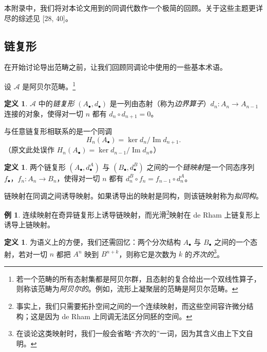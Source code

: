 \documentclass[11pt,a4paper]{article}
\theoremstyle{plain}
\theoremstyle{definition}
\newtheorem{definition}[theorem]{定义}
\newtheorem*{example}{例}
\begin{document}
本附录中，我们将对本论文用到的同调代数作一个极简的回顾。关于这些主题更详尽的综述见 [28, 40]。

\subsection{链复形}

在开始讨论导出范畴之前，让我们回顾同调论中使用的一些基本术语。

设 $\mathcal{A}$ 是阿贝尔范畴。\footnote{若一个范畴的所有态射集都是阿贝尔群，且态射的复合给出一个双线性算子，则称该范畴为\emph{阿贝尔的}。例如，流形上凝聚层的范畴是阿贝尔范畴。}

\begin{definition}
$\mathcal{A}$ 中的\emph{链复形} $(A_\bullet,d_\bullet)$ 是一列由态射（称为\emph{边界算子}）$d_n:A_n\to A_{n-1}$ 连接的对象，使得对一切 $n$ 都有 $d_n\circ d_{n+1}=0$。
\end{definition}

与任意链复形相联系的是一个同调
\[
H_n(A_\bullet)=\ker d_n/\operatorname{Im}d_{n+1}.
\]
（原文此处误作 $H_n(A_\bullet)=\ker d_{n-1}/\operatorname{Im}d_n$。）

\begin{definition}
两个链复形 $(A_\bullet,d^A_\bullet)$ 与 $(B_\bullet,d^B_\bullet)$ 之间的一个\emph{链映射}是一个同态序列 $f_\bullet$，$f_n:A_n\to B_n$，使得对一切 $n$ 都有 $d^B_n\circ f_n=f_{n-1}\circ d^A_n$。
\end{definition}

链映射在同调之间诱导映射。如果诱导出的映射是同构，则该链映射称为\emph{拟同构}。

\begin{example}
连续映射在奇异链复形上诱导链映射，而光滑\footnote{事实上，我们只需要拓扑空间之间的一个连续映射，而这些空间容许微分结构；这是因为 de Rham 上同调无法区分同胚的空间。}映射在 de Rham 上链复形上诱导上链映射。
\end{example}

\begin{definition}
为语义上的方便，我们还需回忆：两个分次结构 $A_\bullet$ 与 $B_\bullet$ 之间的一个态射，若对一切 $n$ 都把 $A^n$ 映到 $B^{n+k}$，则称它是次数为 $k$ 的\emph{齐次的}\footnote{在谈论这类映射时，我们一般会省略“齐次的”一词，因为其含义由上下文自明。}。
\end{definition}
\end{document}
